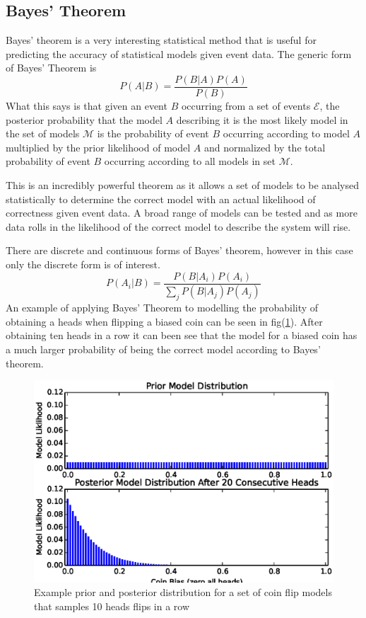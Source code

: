 \subsection{Bayes' Theorem} 
Bayes' theorem is a very interesting statistical method that is useful for predicting the accuracy of statistical models given event data. The generic form of Bayes' Theorem is 
\begin{equation}
P(A|B) = \frac{P(B|A)P(A)}{P(B)} 
\label{eq:bayes}
\end{equation}
What this says is that given an event $B$ occurring from a set of events $\mathcal{E}$, the posterior probability that the model $A$ describing it is the most likely model in the set of models $\mathcal{M}$ is the probability of event $B$ occurring according to model $A$ multiplied by the prior likelihood of model $A$ and normalized by the total probability of event $B$ occurring according to all models in set $\mathcal{M}$.\cite{bayes}

This is an incredibly powerful theorem as it allows a set of models to be analysed statistically to determine the correct model with an actual likelihood of correctness given event data. A broad range of models can be tested and as more data rolls in the likelihood of the correct model to describe the system will rise.

There are discrete and continuous forms of Bayes' theorem, however in this case only the discrete form is of interest. 
\begin{equation}
P(A_i|B) = \frac{P(B|A_i)P(A_i)}{\sum \limits_j P(B|A_j)P(A_j)}
\label{eq:discretebayes}
\end{equation}
An example of applying Bayes' Theorem to modelling the probability of obtaining a heads when flipping a biased coin can be seen in fig(\ref{fig:bayes}). After obtaining ten heads in a row it can been see that the model for a biased coin has a much larger probability of being the correct model according to Bayes' theorem. 
\begin{figure}[ht!]
\centering
\includegraphics[scale=0.8]{Figures/bayes.eps}
\caption{Example prior and posterior distribution for a set of coin flip models that samples 10 heads flips in a row}
\label{fig:bayes}
\end{figure}
